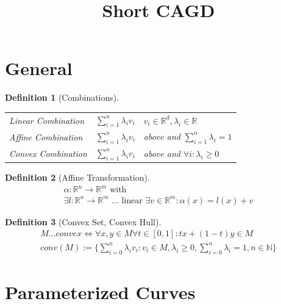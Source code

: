 \documentclass[conference]{IEEEtran}
\newtheorem{definition}{Definition}
\begin{document}
\title{Short CAGD}

\author{}

\maketitle

\section{General}

\begin{definition}[Combinations]
	\hspace{1cm}
	\begin{table}[h!]
		\begin{tabular}{lll}
			Linear Combination & $\sum_{i=1}^{n} \lambda_i v_i$ & $v_i \in \mathbb{R}^d, \lambda_i \in \mathbb{R}$\\
			Affine Combination & $\sum_{i=1}^{n} \lambda_i v_i$ & above and $\sum_{i=1}^{n} \lambda_i = 1$\\
			Convex Combination & $\sum_{i=1}^{n} \lambda_i v_i$ & above and $\forall i: \lambda_i \geq 0$\\
		\end{tabular}
	\end{table}	
\end{definition}

\begin{definition}[Affine Transformation]
	\begin{align*}
		\alpha: \mathbb{R}^n \rightarrow \mathbb{R}^m \text{ with }\\
		\exists l: \mathbb{R}^n \rightarrow \mathbb{R}^m \text{ ... linear } \exists v \in \mathbb{R}^m : \alpha(x) = l(x) + v
	\end{align*}
\end{definition}

\begin{definition}[Convex Set, Convex Hull]
	\begin{align*}
		M ... convex \iff \forall x,y \in M \forall t \in [0, 1] : tx + (1-t)y \in M\\
		conv(M) := \{\sum_{i=0}^{n} \lambda_i v_i: v_i \in M, \lambda_i \geq 0, \sum_{i=0}^{n} \lambda_i = 1, n\in \mathbb{N}\}
	\end{align*}
\end{definition}
	
\section{Parameterized Curves}
\end{document}
